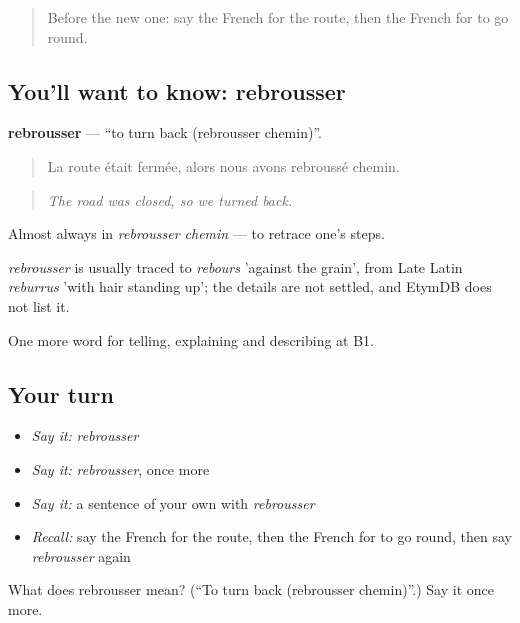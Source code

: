 \label{lesson:FR-C436-rebrousser}



\begin{quote}
Before the new one: say the French for the route, then the French for to go round.
\end{quote}

\subsection*{You'll want to know: rebrousser}
\textbf{rebrousser} — \textquotedblleft{}to turn back (rebrousser chemin)\textquotedblright{}.

\begin{quote}
La route était fermée, alors nous avons rebroussé chemin.
\end{quote}

\begin{quote}
\emph{The road was closed, so we turned back.}
\end{quote}

Almost always in \emph{rebrousser chemin} — to retrace one's steps.

\begin{cousinweb}
\emph{rebrousser} is usually traced to \emph{rebours} 'against the grain', from Late Latin \emph{reburrus} 'with hair standing up'; the details are not settled, and EtymDB does not list it.
\end{cousinweb}

\begin{grammarlens}[title={What you've built}]
One more word for telling, explaining and describing at B1.
\end{grammarlens}

\subsection*{Your turn}
\begin{itemize}
\raggedright
  \item \emph{Say it:} \emph{rebrousser}
  \item \emph{Say it:} \emph{rebrousser}, once more
  \item \emph{Say it:} a sentence of your own with \emph{rebrousser}
  \item \emph{Recall:} say the French for the route, then the French for to go round, then say \emph{rebrousser} again
\end{itemize}

\begin{tcolorbox}[breakable,colback=teal!4,colframe=teal!35!black,title={Before you move on}]
What does rebrousser mean? (\textquotedblleft{}To turn back (rebrousser chemin)\textquotedblright{}.) Say it once more.
\end{tcolorbox}
